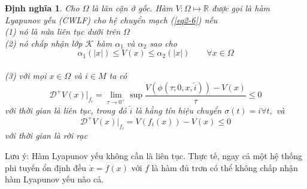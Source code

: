 \documentclass[14pt,a4paper,oneside]{report}		%
\newtheorem{define}[theorem]{Định nghĩa}
\begin{document}
\begin{define} \label{def2-2}
Cho $\Omega$ là lân cận ở gốc. Hàm $V:\Omega \mapsto\mathbb{R}$ được gọi là hàm Lyapunov yếu (CWLF) cho hệ chuyển mạch (\ref{eq2-6}) nếu \\
(1) nó là nửa liên tục dưới trên $\Omega$\\
(2) nó chấp nhận lớp $\mathcal{K}$ hàm $\alpha_1$ và $\alpha_2$ sao cho
$$\alpha_1(|x|)\leq V(x)\leq \alpha_2(|x|)\qquad \forall x\in\Omega$$\\
(3) với mọi $x\in\Omega$ và $i\in M$ ta có
$$\mathcal{D}^+V(x)|_{f_i} = \lim_{\tau \rightarrow 0^+}\sup\frac{V(\phi(\tau;0,x,\widehat{i}))-V(x)}{\tau}\leq 0$$
với thời gian là liên tục, trong đó $\widehat{i}$ là hằng tín hiệu chuyển $\sigma(t)=i \forall t,$ và
$$\mathcal{D}^+V(x)|_{f_i}=V(f_i(x))-V(x)\leq 0$$
với thời gian là rời rạc
\end{define}

Lưu ý: Hàm Lyapunov yếu không cần là liên tục. Thực tế, ngay cả một hệ thống phi tuyến ổn định đều $\dot{x}=f(x)$ với $f$ là hàm đủ trơn có thể không chấp nhận hàm Lyapunov yếu nào cả.
\end{document}
